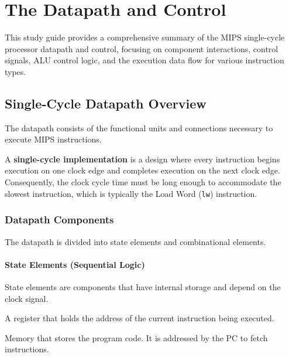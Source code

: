 \chapter{The Datapath and Control}

This study guide provides a comprehensive summary of the MIPS single-cycle processor datapath and control, focusing on component interactions, control signals, ALU control logic, and the execution data flow for various instruction types.

\section{Single-Cycle Datapath Overview}

The datapath consists of the functional units and connections necessary to execute MIPS instructions.

\begin{definition}
A \textbf{single-cycle implementation} is a design where every instruction begins execution on one clock edge and completes execution on the next clock edge. Consequently, the clock cycle time must be long enough to accommodate the slowest instruction, which is typically the Load Word (\texttt{lw}) instruction.
\end{definition}

\subsection{Datapath Components}

The datapath is divided into state elements and combinational elements.

\subsubsection{State Elements (Sequential Logic)}
State elements are components that have internal storage and depend on the clock signal.

\begin{vocabulary}
A register that holds the address of the current instruction being executed.
\end{vocabulary}

\begin{vocabulary}
Memory that stores the program code. It is addressed by the PC to fetch instructions.
\end{vocabulary}

